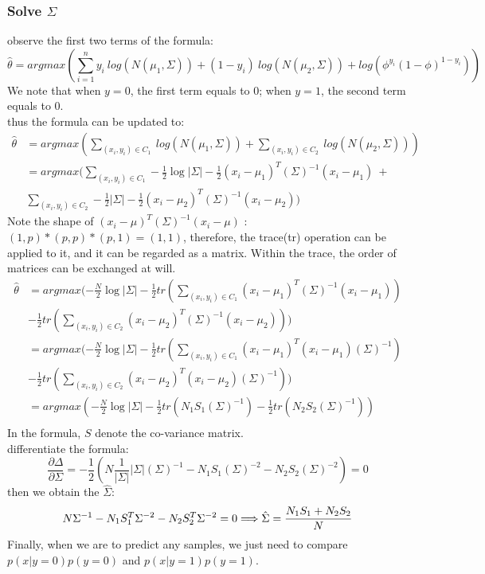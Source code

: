 \documentclass{report}
\begin{document}
\subsubsection{Solve $\Sigma$}
observe the first two terms of the formula:
$$
\hat{\theta}=argmax(\sum_{i=1}^n y_i\ log(N(\mu_1,\Sigma))+(1-y_i)\ log(N(\mu_2,\Sigma))+log(\phi^{y_i} (1-\phi)^{1-y_i}))
$$
We note that when $y=0$, the first term equals to $0$; when $y=1$, the second term equals to $0$.\\
thus the formula can be updated to:
$$
\begin{aligned}
\hat{\theta}
&=argmax(\sum_{(x_i,y_i)\in C_1} \ log(N(\mu_1,\Sigma))+\sum_{(x_i,y_i)\in C_2}\ log(N(\mu_2,\Sigma)))\\
&=argmax(\sum_{(x_i,y_i)\in C_1} -\frac{1}{2}\log|\Sigma|-\frac{1}{2}(x_i-\mu_1)^T(\Sigma)^{-1}(x_i-\mu_1)\ +\\
&\sum_{(x_i,y_i)\in C_2} -\frac{1}{2}|\Sigma|-\frac{1}{2}(x_i-\mu_2)^T(\Sigma)^{-1}(x_i-\mu_2))
\end{aligned}
$$
Note the shape of $(x_i-\mu)^T(\Sigma)^{-1}(x_i-\mu)$ : $(1,p)* (p,p) * (p,1)=(1,1)$, therefore, the trace(tr) operation can be applied to it, and it can be regarded as a matrix. Within the trace, the order of matrices can be exchanged at will.
$$
\begin{aligned}
\hat{\theta}
&=argmax(-\frac{N}{2}\log|\Sigma|-\frac{1}{2}tr(\sum_{(x_i,y_i)\in C_1}(x_i-\mu_1)^T(\Sigma)^{-1}(x_i-\mu_1))\\
&-\frac{1}{2}tr(\sum_{(x_i,y_i)\in C_2}(x_i-\mu_2)^T(\Sigma)^{-1}(x_i-\mu_2)))\\
&=argmax(-\frac{N}{2}\log|\Sigma|-\frac{1}{2}tr(\sum_{(x_i,y_i)\in C_1}(x_i-\mu_1)^T(x_i-\mu_1)(\Sigma)^{-1})\\
&-\frac{1}{2}tr(\sum_{(x_i,y_i)\in C_2}(x_i-\mu_2)^T(x_i-\mu_2)(\Sigma)^{-1}))\\
&=argmax(-\frac{N}{2}\log|\Sigma|-\frac{1}{2}tr(N_1 S_1(\Sigma)^{-1})
-\frac{1}{2}tr(N_2 S_2(\Sigma)^{-1}))\\
\end{aligned}
$$
In the formula, $S$ denote the co-variance matrix.\\
differentiate the formula:
$$
\frac{\partial \Delta}{\partial \Sigma}=-\frac{1}{2}(N \frac{1}{|\Sigma|}|\Sigma|(\Sigma)^{-1}-N_1S_1(\Sigma)^{-2}-N_2S_2(\Sigma)^{-2})=0
$$
then we obtain the $\hat{\Sigma}$: 
$$
N \Sigma^{-1}-N_{1} S_{1}^{T} \Sigma^{-2}-N_{2} S_{2}^{T} \Sigma^{-2}=0\\
\Longrightarrow \hat{\Sigma}=\frac{N_{1} S_{1}+N_{2} S_{2}}{N}
$$
Finally, when we are to predict any samples, we just need to compare $p(x|y=0)p(y=0)$ and $p(x|y=1)p(y=1)$.
\end{document}

